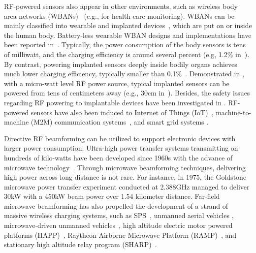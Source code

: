 \documentclass[twocolumn,10pt]{IEEEtran}
\begin{document}
RF-powered sensors also appear in other environments, such as wireless body area networks (WBANs)~\cite{H.2013Jiang,S.2015Rao} (e.g., for health-care monitoring). WBANs can be mainly classified into wearable and implanted devices~\cite{F.2010Zhang}, which are put on or inside the human body. Battery-less wearable WBAN designs and implementations have been reported in~\cite{Y.2014Toh,N.2014Desai, J.2012Olivo}.
Typically, the power consumption of the body sensors is tens of milliwatt, and the charging efficiency is around several percent (e.g, 1.2$\%$ in~\cite{N.2014Desai}). 
By contrast, powering implanted sensors deeply inside bodily organs achieves much lower charging efficiency, typically smaller than 0.1$\%$~\cite{S.2014Majerus}.   
Demonstrated in \cite{S.2014Majerus,Y.2011Chow,M.2013Arsalan}, with a micro-watt level RF power source, typical implanted sensors can be powered from tens of centimeters away (e.g., 30cm in~\cite{Y.2011Chow}). Besides, the safety issues regarding RF powering to implantable devices have been investigated in \cite{A.2013Bercich}. RF-powered sensors have also been induced to Internet of Things (IoT)~\cite{K.2012Chen,S.2014Gollakota}, machine-to-machine (M2M) communication systems~\cite{K.2012Ng}, and smart grid systems \cite{Erol-Kantarci2012Suresense,Erol-Kantarci2012DRIFT,U.2014Baroudi}. 



Directive RF beamforming can be utilized to support electronic devices with larger power consumption. Ultra-high power transfer systems transmitting on hundreds of kilo-watts have been developed since 1960s with the advance of microwave technology~\cite{K.2015Huang}. Through microwave beamforming techniques, delivering high power across long distance is not rare. For instance, in 1975, the Goldstone microwave power transfer experiment conducted at 2.388GHz managed to deliver 30kW with a 450kW beam power over 1.54 kilometer distance. Far-field microwave beamforming has also propelled the development of a strand of massive wireless charging systems, such as SPS~\cite{H.1996Nansen,E.1977Glaser,C.1992Brown}, unmanned aerial vehicles \cite{A.1996Foote,J.2006Kim}, microwave-driven unmanned vehicles~\cite{J.2013Miyasaka,J.2014Miyasaka,A.2007Oida}, high altitude 
electric motor powered platforms (HAPP)~\cite{K.1982Stefan,B.1982Ernald}, Raytheon Airborne Microwave Platform (RAMP)~\cite{B.2013Strassner},  and stationary high altitude relay program (SHARP)~\cite{J.1985Schlesak, R.1992East}. 
\end{document}
